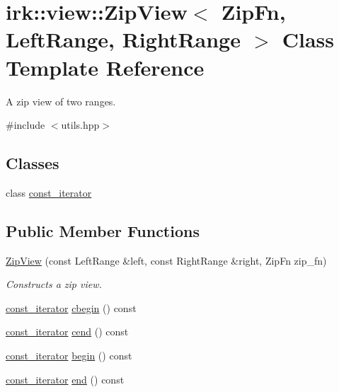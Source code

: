 \hypertarget{classirk_1_1view_1_1ZipView}{}\section{irk\+:\+:view\+:\+:Zip\+View$<$ Zip\+Fn, Left\+Range, Right\+Range $>$ Class Template Reference}
\label{classirk_1_1view_1_1ZipView}


A zip view of two ranges.  




{\ttfamily \#include $<$utils.\+hpp$>$}

\subsection*{Classes}
\begin{DoxyCompactItemize}
\item 
class \mbox{\hyperlink{classirk_1_1view_1_1ZipView_1_1const__iterator}{const\+\_\+iterator}}
\end{DoxyCompactItemize}
\subsection*{Public Member Functions}
\begin{DoxyCompactItemize}
\item 
\mbox{\hyperlink{classirk_1_1view_1_1ZipView_a538eabe5e10f14e89bbe394bf601af41}{Zip\+View}} (const Left\+Range \&left, const Right\+Range \&right, Zip\+Fn zip\+\_\+fn)
\begin{DoxyCompactList}\small\item\em Constructs a zip view. \end{DoxyCompactList}\item 
\mbox{\hyperlink{classirk_1_1view_1_1ZipView_1_1const__iterator}{const\+\_\+iterator}} \mbox{\hyperlink{classirk_1_1view_1_1ZipView_a96a6642c69e0c636bdbf744835dd4c32}{cbegin}} () const
\item 
\mbox{\hyperlink{classirk_1_1view_1_1ZipView_1_1const__iterator}{const\+\_\+iterator}} \mbox{\hyperlink{classirk_1_1view_1_1ZipView_a6fbf8792537a7ceddb15fa78e3c86221}{cend}} () const
\item 
\mbox{\hyperlink{classirk_1_1view_1_1ZipView_1_1const__iterator}{const\+\_\+iterator}} \mbox{\hyperlink{classirk_1_1view_1_1ZipView_abd2ea0fef08e1af68575f10f23e0fbed}{begin}} () const
\item 
\mbox{\hyperlink{classirk_1_1view_1_1ZipView_1_1const__iterator}{const\+\_\+iterator}} \mbox{\hyperlink{classirk_1_1view_1_1ZipView_a4739d0dbb2dd5e6a5c31f456cd8e62fc}{end}} () const
\end{DoxyCompactItemize}


